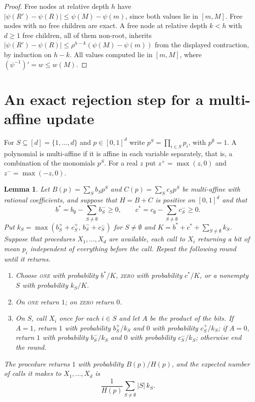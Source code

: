 \documentclass[11pt]{amsart}
\newtheorem{lemma}[theorem]{Lemma}
\newcommand{\nsc}[1]{\textnormal{\textsc{#1}}}
\begin{document}
\begin{proof}
Free nodes at relative depth $h$ have $|\psi(R')-\psi(R)|\le\psi(M)-\psi(m)$, since both values lie in $[m,M]$. Free nodes with no free children are exact. A free node at relative depth $k<h$ with $d\ge1$ free children, all of them non-root, inherits $|\psi(R')-\psi(R)|\le\rho^{h-k}(\psi(M)-\psi(m))$ from the displayed contraction, by induction on $h-k$. All values computed lie in $[m,M]$, where $(\psi^{-1})'=w\le w(M)$.
\end{proof}

\section{An exact rejection step for a multi-affine update}\label{sec:race}

For $S\subseteq[d]=\{1,\dots,d\}$ and $p\in[0,1]^d$ write $p^S=\prod_{i\in S}p_i$, with $p^\emptyset=1$. A polynomial is multi-affine if it is affine in each variable separately, that is, a combination of the monomials $p^S$. For a real $z$ put $z^+=\max(z,0)$ and $z^-=\max(-z,0)$.

\begin{lemma}\label{lem:race}
Let $B(p)=\sum_Sb_Sp^S$ and $C(p)=\sum_Sc_Sp^S$ be multi-affine with rational coefficients, and suppose that $H=B+C$ is positive on $[0,1]^d$ and that
\[
b^*=b_\emptyset-\sum_{S\ne\emptyset}b_S^-\ge0,\qquad c^*=c_\emptyset-\sum_{S\ne\emptyset}c_S^-\ge0 .
\]
Put $k_S=\max(b_S^++c_S^+,\,b_S^-+c_S^-)$ for $S\ne\emptyset$ and $K=b^*+c^*+\sum_{S\ne\emptyset}k_S$. Suppose that procedures $X_1,\dots,X_d$ are available, each call to $X_i$ returning a bit of mean $p_i$ independent of everything before the call. Repeat the following round until it returns.
\begin{enumerate}
\item Choose \nsc{one} with probability $b^*/K$, \nsc{zero} with probability $c^*/K$, or a nonempty $S$ with probability $k_S/K$.
\item On \nsc{one} return $1$; on \nsc{zero} return $0$.
\item On $S$, call $X_i$ once for each $i\in S$ and let $A$ be the product of the bits. If $A=1$, return $1$ with probability $b_S^+/k_S$ and $0$ with probability $c_S^+/k_S$; if $A=0$, return $1$ with probability $b_S^-/k_S$ and $0$ with probability $c_S^-/k_S$; otherwise end the round.
\end{enumerate}
The procedure returns $1$ with probability $B(p)/H(p)$, and the expected number of calls it makes to $X_1,\dots,X_d$ is
\[
\frac1{H(p)}\sum_{S\ne\emptyset}|S|\,k_S .
\]
\end{lemma}
\end{document}
